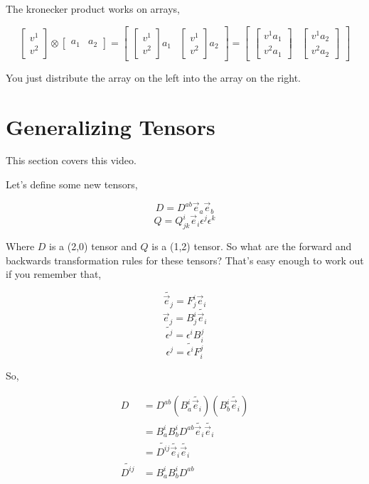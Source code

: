 \documentclass[12pt]{book}
\theoremstyle{plain}
\theoremstyle{definition}
\theoremstyle{ppart}
\theoremstyle{case}
\theoremstyle{solution}
\begin{document}
The kronecker product works on arrays,

\[
  \begin{bmatrix}
  v^1 \\
  v^2
  \end{bmatrix}
  \otimes
  \begin{bmatrix}
  a_1 & a_2
  \end{bmatrix}
  =
  \begin{bmatrix}
    \begin{bmatrix}
    v^1 \\
    v^2
    \end{bmatrix}
    a_1 
  & 
    \begin{bmatrix}
    v^1 \\
    v^2
    \end{bmatrix}
    a_2
  \end{bmatrix}
  =
  \begin{bmatrix}
    \begin{bmatrix}
    v^1 a_1 \\
    v^2 a_1 
    \end{bmatrix}
  & 
    \begin{bmatrix}
    v^1 a_2 \\
    v^2 a_2 
    \end{bmatrix}
  \end{bmatrix}
\]

You just distribute the array on the left into the array on the right.

\section{Generalizing Tensors}

This section covers this \cite{youtube:tensor12} video.

Let's define some new tensors,

\[ D = D^{ab} \vec{e}_a \vec{e}_b \]
\[ Q = Q^i_{jk} \vec{e}_i \epsilon^j \epsilon^k \]

Where $D$ is a (2,0) tensor and $Q$ is a (1,2) tensor.
So what are the forward and backwards transformation rules for these tensors?
That's easy enough to work out if you remember that,

\[ \widetilde{\vec{e}_j} = F^i_j \vec{e}_i \]
\[ \vec{e}_j = B^i_j \widetilde{\vec{e}_i} \]
\[ \widetilde{\epsilon^j} = \epsilon^i B^j_i \]
\[ \epsilon^j = \widetilde{\epsilon^i} F^j_i \]

So,

\begin{align*}
  D &= D^{ab} (B^i_a \widetilde{\vec{e}_i}) (B^i_b \widetilde{\vec{e}_i}) \\
  &= B^i_a B^i_b D^{ab} \widetilde{\vec{e}_i} \widetilde{\vec{e}_i} \\
  &=  \widetilde{D^{ij}} \widetilde{\vec{e}_i} \widetilde{\vec{e}_i} \\
  \widetilde{D^{ij}} &= B^i_a B^i_b D^{ab}
\end{align*}
\end{document}
